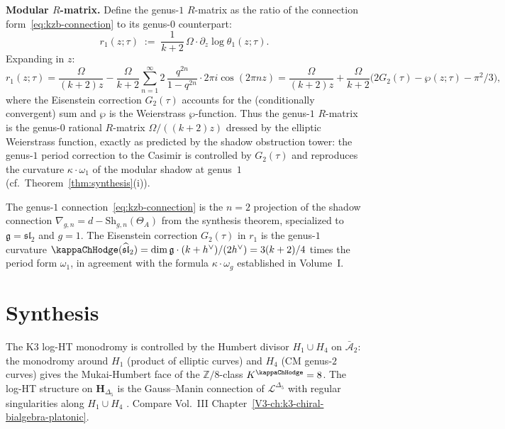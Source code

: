 \begin{computation}
\medskip\noindent\textbf{Modular $R$-matrix.}\;
Define the genus-$1$ $R$-matrix as the ratio of the connection
form~\eqref{eq:kzb-connection} to its genus-$0$ counterpart:
\begin{equation}%
 r_1(z;\tau) \;:=\; \frac{1}{k+2}\,\Omega\cdot \partial_z\!\log\theta_1(z;\tau).
\end{equation}
Expanding in $z$:
\[
 r_1(z;\tau)
 = \frac{\Omega}{(k+2)z}
 - \frac{\Omega}{k+2}\sum_{n=1}^{\infty}2\,
 \frac{q^{2n}}{1-q^{2n}}\cdot 2\pi i\cos(2\pi nz)
 = \frac{\Omega}{(k+2)z}
 + \frac{\Omega}{k+2}\bigl(2G_2(\tau)-\wp(z;\tau)-\pi^2/3\bigr),
\]
where the Eisenstein correction $G_2(\tau)$ accounts for the
(conditionally convergent) sum and $\wp$ is the Weierstrass
$\wp$-function. Thus the genus-$1$ $R$-matrix is the genus-$0$
rational $R$-matrix $\Omega/((k+2)z)$ dressed by the elliptic
Weierstrass function, exactly as predicted by the shadow obstruction tower:
the genus-$1$ period correction to the Casimir is controlled by
$G_2(\tau)$ and reproduces the curvature $\kappa\cdot\omega_1$
of the modular shadow at genus~$1$
(cf.\ Theorem~\ref{thm:synthesis}\textup{(i)}).
\end{computation}

\begin{remark}
The genus-$1$ connection~\eqref{eq:kzb-connection} is the $n=2$ projection
of the shadow connection $\nabla_{g,n}=d-\mathrm{Sh}_{g,n}(\Theta_A)$
from the synthesis theorem, specialized to $\mathfrak{g}=\mathfrak{sl}_2$
and $g=1$. The Eisenstein correction $G_2(\tau)$ in $r_1$
is the genus-$1$ curvature $\kappaChHodge(\widehat{\mathfrak{sl}}_2)
=\dim\mathfrak{g}\cdot(k+h^\vee)/(2h^\vee)=3(k+2)/4$
times the period form $\omega_1$, in agreement with the formula
$\kappa\cdot\omega_g$ established in Volume~I.
\end{remark}


\section{Synthesis}
\label{sec:lhm-supplement}

\begin{remark}
\label{rem:lhm-1}
The K3 log-HT monodromy is controlled by the Humbert divisor
$H_1\cup H_4$ on $\bar{\mathcal A}_2$: the monodromy around $H_1$
(product of elliptic curves) and $H_4$ (CM genus-$2$ curves) gives the
Mukai-Humbert face of the $\mathbb Z/8$-class
$K^{\kappaChHodge} = 8$. The log-HT structure on
$\mathbf H_{\Delta_5}$ is the Gauss--Manin connection of
$\mathcal L^{\Delta_5}$ with regular singularities along $H_1\cup H_4$
\cite{Bruinier2002,GritsenkoNikulin1998}. Compare Vol.~III
Chapter~\ref{V3-ch:k3-chiral-bialgebra-platonic}.
\end{remark}
